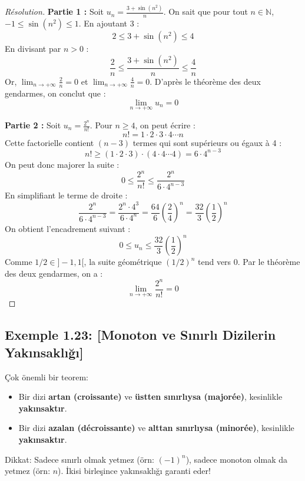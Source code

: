 \documentclass[12pt,a4paper]{report}
\begin{document}
\begin{proof}[Résolution]
\textbf{Partie 1 :}
Soit $u_n = \frac{3 + \sin(n^2)}{n}$.
On sait que pour tout $n \in \mathbb{N}$, $-1 \le \sin(n^2) \le 1$. En ajoutant 3 :
\[ 2 \le 3 + \sin(n^2) \le 4 \]
En divisant par $n > 0$ :
\[ \frac{2}{n} \le \frac{3 + \sin(n^2)}{n} \le \frac{4}{n} \]
Or, $\lim_{n \to +\infty} \frac{2}{n} = 0$ et $\lim_{n \to +\infty} \frac{4}{n} = 0$.
D'après le théorème des deux gendarmes, on conclut que :
\[ \lim_{n \to +\infty} u_n = 0 \]

\textbf{Partie 2 :}
Soit $u_n = \frac{2^n}{n!}$.
Pour $n \ge 4$, on peut écrire :
\[ n! = 1 \cdot 2 \cdot 3 \cdot 4 \cdots n \]
Cette factorielle contient $(n-3)$ termes qui sont supérieurs ou égaux à 4 :
\[ n! \ge (1 \cdot 2 \cdot 3) \cdot (4 \cdot 4 \cdots 4) = 6 \cdot 4^{n-3} \]
On peut donc majorer la suite :
\[ 0 \le \frac{2^n}{n!} \le \frac{2^n}{6 \cdot 4^{n-3}} \]
En simplifiant le terme de droite :
\[ \frac{2^n}{6 \cdot 4^{n-3}} = \frac{2^n \cdot 4^3}{6 \cdot 4^n} = \frac{64}{6} \left(\frac{2}{4}\right)^n = \frac{32}{3} \left(\frac{1}{2}\right)^n \]
On obtient l'encadrement suivant :
\[ 0 \le u_n \le \frac{32}{3} \left(\frac{1}{2}\right)^n \]
Comme $1/2 \in ]-1, 1[$, la suite géométrique $(1/2)^n$ tend vers 0. Par le théorème des deux gendarmes, on a :
\[ \lim_{n \to +\infty} \frac{2^n}{n!} = 0 \]
\end{proof}

\subsection*{Exemple 1.23: [Monoton ve Sınırlı Dizilerin Yakınsaklığı]}

\begin{tcolorbox}[colback=cyan!5!white,colframe=cyan!75!black,title=Hatırlatma (Rappel): Monotonluk ve Sınırlılık (Convergence des suites monotones)]
Çok önemli bir teorem:
\begin{itemize}
    \item Bir dizi \textbf{artan (croissante)} ve \textbf{üstten sınırlıysa (majorée)}, kesinlikle \textbf{yakınsaktır}.
    \item Bir dizi \textbf{azalan (décroissante)} ve \textbf{alttan sınırlıysa (minorée)}, kesinlikle \textbf{yakınsaktır}.
\end{itemize}
Dikkat: Sadece sınırlı olmak yetmez (örn: $(-1)^n$), sadece monoton olmak da yetmez (örn: $n$). İkisi birleşince yakınsaklığı garanti eder!
\end{tcolorbox}
\end{document}

